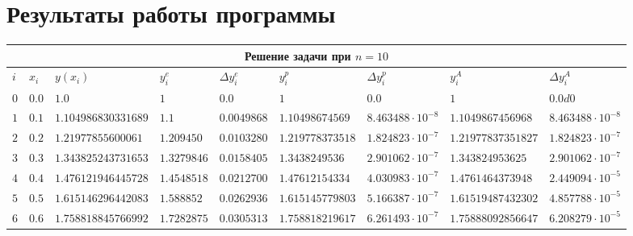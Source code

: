 \section{Результаты работы программы}
\begin{table}[h!]
	\hspace{-3em}
	\scriptsize
	\begin{tabular}{|p{2ex}|p{3ex}|l|l|l|l|l|l|l|}
		\hline
		\multicolumn{9}{|c|}{Решение задачи при $n = 10$}                                                                                                                                                                              \\
		\hline
		$i$    & $x_i$                   & $y(x_i)$               & $y^e_i$                  & $\Delta y^e_i$           & $y^p_i$                  & $\Delta y^p_i$            & $y^A_i$                  & $\Delta y^A_i$             \\
		\hline
		$  0 $ & $                 0.0 $ & $                1.0 $ & $                    1 $ & $                  0.0 $ & $                    1 $ & $                0.0 $    & $                    1 $ & $                 0.0d0 $  \\
		$  1 $ & $                 0.1 $ & $ 1.104986830331689 $  & $                1.1 $   & $ 0.0049868 $            & $  1.10498674569 $       & $ 8.463488\cdot 10^{-8} $ & $  1.1049867456968 $     & $  8.463488\cdot 10^{-8} $ \\
		$  2 $ & $                 0.2 $ & $  1.21977855600061 $  & $  1.209450 $            & $ 0.0103280 $            & $ 1.219778373518 $       & $ 1.824823\cdot 10^{-7} $ & $ 1.21977837351827 $     & $  1.824823\cdot 10^{-7} $ \\
		$  3 $ & $ 0.3 $                 & $ 1.343825243731653 $  & $ 1.3279846 $            & $ 0.0158405 $            & $   1.3438249536 $       & $ 2.901062\cdot 10^{-7} $ & $   1.343824953625 $     & $  2.901062\cdot 10^{-7} $ \\
		$  4 $ & $                 0.4 $ & $ 1.476121946445728 $  & $ 1.4548518 $            & $ 0.0212700 $            & $  1.47612154334 $       & $ 4.030983\cdot 10^{-7} $ & $  1.4761464373948 $     & $  2.449094\cdot 10^{-5} $ \\
		$  5 $ & $                 0.5 $ & $ 1.615146296442083 $  & $  1.588852 $            & $ 0.0262936 $            & $ 1.615145779803 $       & $ 5.166387\cdot 10^{-7} $ & $ 1.61519487432302 $     & $  4.857788\cdot 10^{-5} $ \\
		$  6 $ & $  0.6 $                & $ 1.758818845766992 $  & $ 1.7282875 $            & $ 0.0305313 $            & $ 1.758818219617 $       & $ 6.261493\cdot 10^{-7} $ & $ 1.75888092856647 $     & $  6.208279\cdot 10^{-5} $ \\

\end{tabular}
\end{table}
